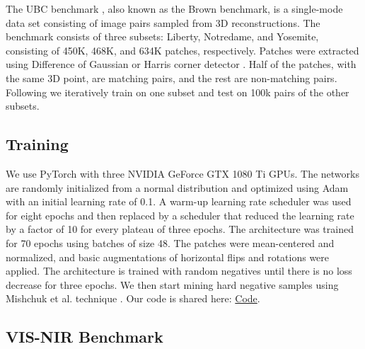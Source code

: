 \documentclass[10pt,journal]{IEEEtran}\usepackage{amsfonts}
\begin{document}
The UBC benchmark \cite{UBC_benchmark}, also known as the Brown benchmark,
is a single-mode data set consisting of image pairs sampled from 3D
reconstructions. The benchmark consists of three subsets: Liberty,
Notredame, and Yosemite, consisting of 450K, 468K, and 634K patches,
respectively. Patches were extracted using Difference of Gaussian \cite{SIFT}
or Harris corner detector \cite{harris}. Half of the patches, with the same
3D point, are matching pairs, and the rest are non-matching pairs. Following
\cite{UBC_benchmark, L2Net, Zagoruyko, HardNet} we iteratively train on one
subset and test on 100k pairs of the other subsets.

\subsection{Training}

We use PyTorch \cite{PyTorch} with three NVIDIA GeForce GTX 1080 Ti GPUs.
The networks are randomly initialized from a normal distribution and
optimized using Adam \cite{Adam} with an initial learning rate of 0.1. A
warm-up learning rate scheduler \cite{ImageNetOneHour} was used for eight
epochs and then replaced by a scheduler that reduced the learning rate by a
factor of 10 for every plateau of three epochs. The architecture was trained
for 70 epochs using batches of size 48. The patches were mean-centered and
normalized, and basic augmentations of horizontal flips and rotations were
applied. The architecture is trained with random negatives until there is no
loss decrease for three epochs. We then start mining hard negative samples
using Mishchuk et al. technique \cite{HardNet}. Our code is shared here:
\href{https://github.com/CodeJjang/multiscale-attention-patch-matching}{Code}.

\subsection{VIS-NIR Benchmark}
\end{document}
